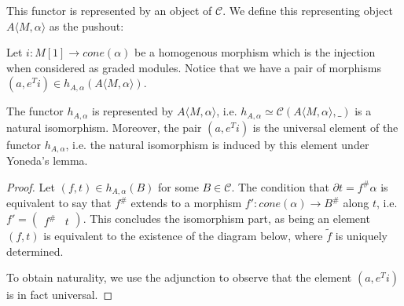 \documentclass[../thesis.tex]{subfiles}
\begin{document}
            This functor is represented by an object of $\mathcal{C}$. We define this representing object $A\langle M, \alpha\rangle$ as the pushout:
            \begin{center}
            \end{center}
            Let $i: M[1] \rightarrow cone(\alpha)$ be a homogenous morphism which is the injection when considered as graded modules. Notice that we have a pair of morphisms $(a, e^Ti)\in h_{A,\alpha}(A\langle M,\alpha\rangle)$.
                
            \begin{proposition}\label{prop: universal-h}
                The functor $h_{A,\alpha}$ is represented by $A\langle M,\alpha\rangle$, i.e. $h_{A,\alpha}\simeq \mathcal{C}(A\langle M,\alpha\rangle,\_)$ is a natural isomorphism. Moreover, the pair $(a,e^Ti)$ is the universal element of the functor $h_{A,\alpha}$, i.e. the natural isomorphism is induced by this element under Yoneda's lemma.
            \end{proposition}

            \begin{proof}
                Let $(f,t)\in h_{A,\alpha}(B)$ for some $B\in\mathcal{C}$. The condition that $\partial t = f^\#\alpha$ is equivalent to say that $f^\#$ extends to a morphism $f' : cone(\alpha) \rightarrow B^\#$ along $t$, i.e. $f' = \begin{pmatrix}f^\# & t\end{pmatrix}$. This concludes the isomorphism part, as being an element $(f,t)$ is equivalent to the existence of the diagram below, where $\widetilde{f}$ is uniquely determined.
                \begin{center}
                \end{center}
  
                To obtain naturality, we use the adjunction to observe that the element $(a, e^Ti)$ is in fact universal.
            \end{proof}
\end{document}
